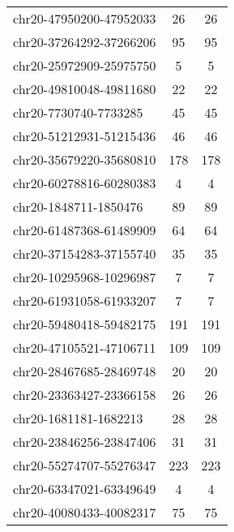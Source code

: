\begin{longtable}{lSS}
	chr20-47950200-47952033 & 26     & 26                                        \\
	chr20-37264292-37266206 & 95     & 95                                        \\
	chr20-25972909-25975750 & 5      & 5                                         \\
	chr20-49810048-49811680 & 22     & 22                                        \\
	chr20-7730740-7733285   & 45     & 45                                        \\
	chr20-51212931-51215436 & 46     & 46                                        \\
	chr20-35679220-35680810 & 178    & 178                                       \\
	chr20-60278816-60280383 & 4      & 4                                         \\
	chr20-1848711-1850476   & 89     & 89                                        \\
	chr20-61487368-61489909 & 64     & 64                                        \\
	chr20-37154283-37155740 & 35     & 35                                        \\
	chr20-10295968-10296987 & 7      & 7                                         \\
	chr20-61931058-61933207 & 7      & 7                                         \\
	chr20-59480418-59482175 & 191    & 191                                       \\
	chr20-47105521-47106711 & 109    & 109                                       \\
	chr20-28467685-28469748 & 20     & 20                                        \\
	chr20-23363427-23366158 & 26     & 26                                        \\
	chr20-1681181-1682213   & 28     & 28                                        \\
	chr20-23846256-23847406 & 31     & 31                                        \\
	chr20-55274707-55276347 & 223    & 223                                       \\
	chr20-63347021-63349649 & 4      & 4                                         \\
	chr20-40080433-40082317 & 75     & 75                                        \\

\end{longtable}
